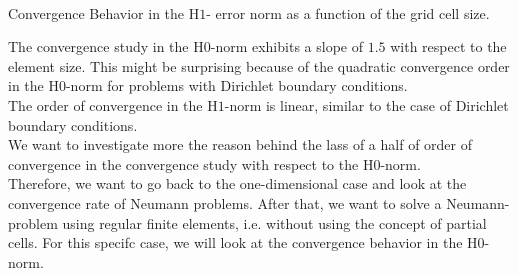 \documentclass[a4paper,12pt]{article}
\makeatletter
\newenvironment{figurehere}
  {\def\@captype{figure}}
  {}
\makeatother
\begin{document}
\begin{center}
\begin{figurehere}
\\
\caption{Convergence Behavior in the H$1$- error norm as a function of the grid cell size.}\label{fig:convergencetorusH1}
\end{figurehere}
\end{center}  
The convergence study in the H$0$-norm exhibits a slope of $1.5$ with respect to the element size. This might be surprising because of the quadratic 
convergence order in the H$0$-norm for problems with Dirichlet boundary conditions. \\
The order of convergence in the H$1$-norm is linear, similar to the case of Dirichlet boundary conditions. \\
We want to investigate more the reason behind the lass of a half of order of convergence in the convergence study with respect to the H$0$-norm.\\
Therefore, we want to go back to the one-dimensional case and look at the convergence rate of Neumann problems. After that, we want to solve
a Neumann-problem using regular finite elements, i.e. without using the concept of partial cells. For this specifc case, we will look at the convergence
behavior in the H$0$-norm. 
\end{document}
